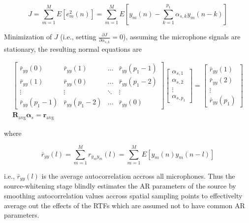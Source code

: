 \begin{equation}
	J = \sum_{m=1}^{M} E[ e_m^2(n) ] = \sum_{m=1}^{M} E[ y_m(n) - \sum_{k=1}^{p_1} \alpha_{s,k} y_m(n-k) ]
\end{equation}

Minimization of $J$ (i.e., setting $\frac{\partial J}{\partial \alpha_{s,k}} = 0$), assuming the microphone signals are stationary, the resulting normal equations are

\begin{eqnarray}
	\begin{bmatrix}
		\bar{r}_{yy}(0) & \bar{r}_{yy}(1) & \dots & \bar{r}_{yy}(p_1-1) \\
		\bar{r}_{yy}(1) & \bar{r}_{yy}(0) & \dots & \bar{r}_{yy}(p_1-2) \\
		\vdots               & \vdots              & \ddots & \vdots \\
		\bar{r}_{yy}(p_1-1) & \bar{r}_{yy}(p_1-2) & \dots & \bar{r}_{yy}(0)
	\end{bmatrix}
	\begin{bmatrix}
		\alpha_{s,1} \\
		\alpha_{s,2}  \\
		\vdots \\
		\alpha_{s,p_1}
	\end{bmatrix} =
	\begin{bmatrix}
		\bar{r}_{yy}(1)  \\
		\bar{r}_{yy}(2)  \\
		\vdots \\
		\bar{r}_{yy}(p_1) 
	\end{bmatrix} \\
	\boldsymbol{R}_{\mathrm{avg}} \boldsymbol{\alpha}_s = \boldsymbol{r}_{\mathrm{avg}} \label{eq:dap_source_whitening_yule_walker}
\end{eqnarray}

\noindent
where

\begin{equation}
	\bar{r}_{yy}(l) = \sum_{m=1}^{M} r_{y_m y_m}(l) = \sum_{m=1}^{M} E[ y_m(n) y_m(n-l) ] \label{eq:dap_avg_autocorr}
\end{equation}

\noindent
i.e., $\bar{r}_{yy}(l)$ is the average autocorrelation accross all microphones. Thus the source-whitening stage blindly estimates the AR parameters of the source by smoothing autocorrelation values accross spatial sampling points to effectivelty average out the effects of the RTFs which are assumed not to have common AR parameters.

